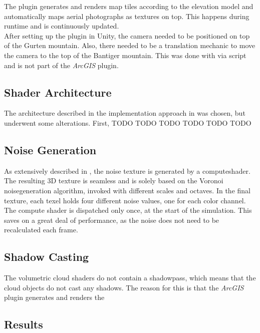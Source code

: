 \noindent
The plugin generates and renders map tiles according to the elevation model and automatically maps aerial photographs as textures on top.
This happens during runtime and is continuously updated.
\\
After setting up the plugin in Unity, the camera needed to be positioned on top of the Gurten mountain. Also, there needed to be a translation mechanic to move the camera to the top of the Bantiger mountain.
This was done with via script and is not part of the \emph{ArcGIS} plugin.

\subsection{Shader Architecture}
\label{section:techimpl:architecture}
The architecture described in the implementation approach in  was chosen, but underwent some alterations.
First, 
TODO
TODO
TODO
TODO
TODO
TODO

\subsection{Noise Generation}
\label{section:techimpl:noise}
As extensively described in , the \gls{noise} texture is generated by a \gls{computeshader}.
The resulting 3D texture is seamless and is solely based on the Voronoi \gls{noisegeneration} algorithm, invoked with different scales and octaves.
In the final texture, each \gls{texel} holds four different \gls{noise} values, one for each color channel.
\\
The compute shader is dispatched only once, at the start of the simulation. This saves on a great deal of performance, as the \gls{noise} does not need to be recalculated each frame.

\subsection{Shadow Casting}
\label{section:techimpl:shadow}
The \gls{volumetric} cloud \gls{shader}s do not contain a \gls{shadowpass}, which means that the cloud objects do not cast any shadows.
The reason for this is that the \emph{ArcGIS} plugin generates and renders the 

\subsection{Results}
\label{section:techimpl:results}

